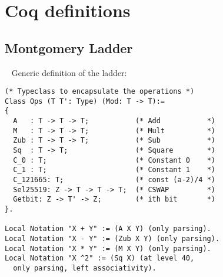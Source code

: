 \section{Coq definitions}
\label{appendix:coq}

\subsection{Montgomery Ladder}
\label{subsubsec:coq-ladder}
~
Generic definition of the ladder:

\begin{lstlisting}[language=Coq]
(* Typeclass to encapsulate the operations *)
Class Ops (T T': Type) (Mod: T -> T):=
{
  A   : T -> T -> T;           (* Add           *)
  M   : T -> T -> T;           (* Mult          *)
  Zub : T -> T -> T;           (* Sub           *)
  Sq  : T -> T;                (* Square        *)
  C_0 : T;                     (* Constant 0    *)
  C_1 : T;                     (* Constant 1    *)
  C_121665: T;                 (* const (a-2)/4 *)
  Sel25519: Z -> T -> T -> T;  (* CSWAP         *)
  Getbit: Z -> T' -> Z;        (* ith bit       *)
}.

Local Notation "X + Y" := (A X Y) (only parsing).
Local Notation "X - Y" := (Zub X Y) (only parsing).
Local Notation "X * Y" := (M X Y) (only parsing).
Local Notation "X ^2" := (Sq X) (at level 40,
  only parsing, left associativity).


\end{lstlisting}
